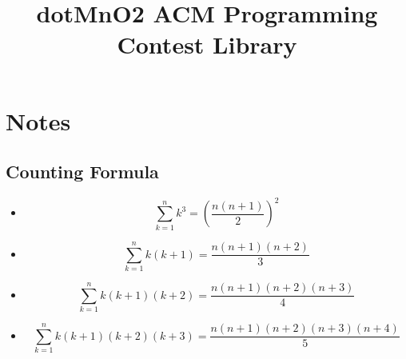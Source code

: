 \documentclass{article}
\begin{document}

\title{dotMnO2 ACM Programming Contest Library}
\address{mno2.csie@gmail.com}
\ninept
\maketitle
\begin{multicols}{2}
\tableofcontents
\end{multicols}
\setcounter{secnumdepth}{1}

\lstset{language=c++}
\lstset{frame=single}
\lstset{linewidth=\textwidth}
\lstset{breaklines=true}
\lstset{basicstyle=\scriptsize}
\lstset{commentstyle=\textit, stringstyle=\upshape,showspaces=false}

\section{Notes}
    \subsection{Counting Formula}
        \begin{itemize}
            \item 
                \[
                    \sum_{k=1}^n k^3 = \left( \frac{n(n+1)}{2} \right)^2 
                \]
            \item 
                \[
                    \sum_{k=1}^n k(k+1) = \frac{n(n+1)(n+2)}{3}
                \]
            \item
                \[
                    \sum_{k=1}^n k(k+1)(k+2) = \frac{n(n+1)(n+2)(n+3)}{4}
                \]
            \item
                \[
                    \sum_{k=1}^n k(k+1)(k+2)(k+3) = \frac{n(n+1)(n+2)(n+3)(n+4)}{5}
                \]
        \end{itemize}
\end{document}
